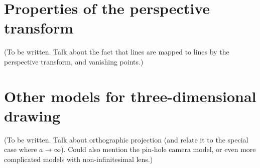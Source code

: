 \documentclass[12pt]{article}
\begin{document}
\section{Properties of the perspective transform}

(To be written. Talk about the fact that lines are mapped to lines
by the perspective transform, and vanishing points.)

\section{Other models for three-dimensional drawing}

(To be written. Talk about orthographic projection (and relate it to
the special case where $a \to \infty$).  Could also mention 
the pin-hole camera model, or even more complicated models with non-infinitesimal lens.)
\end{document}
